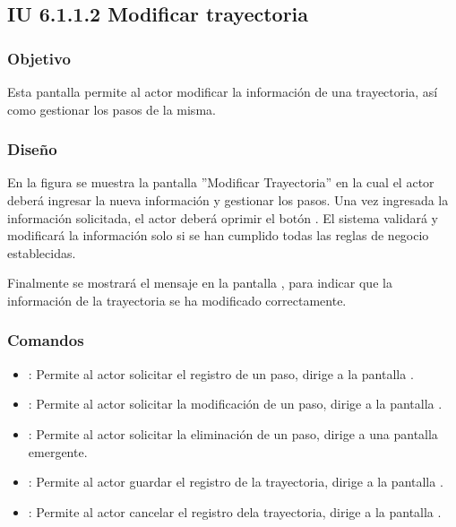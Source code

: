 \subsection{IU 6.1.1.2 Modificar trayectoria}

\subsubsection{Objetivo}
	Esta pantalla permite al actor modificar la información de una trayectoria, así como gestionar los pasos de la misma.
\subsubsection{Diseño}
	En la figura  se muestra la pantalla ''Modificar Trayectoria'' en la cual el actor deberá ingresar la nueva información y gestionar los pasos.
	Una vez ingresada la información solicitada, el actor deberá oprimir el botón  . El sistema validará y modificará la información solo si se han cumplido todas las reglas de negocio establecidas.
	
	Finalmente se mostrará el mensaje  en la pantalla , para indicar que la información de la trayectoria se ha modificado correctamente.

\subsubsection{Comandos}
\begin{itemize}
	\item {}: Permite al actor solicitar el registro de un paso, dirige a la pantalla .
	\item \editar [Modificar]: Permite al actor solicitar la modificación de un paso, dirige a la pantalla .
	\item \eliminar [Eliminar]: Permite al actor solicitar la eliminación de un paso, dirige a una pantalla emergente.
	\item {}: Permite al actor guardar el registro de la trayectoria, dirige a la pantalla .
	\item {}: Permite al actor cancelar el registro dela trayectoria, dirige a la pantalla .
\end{itemize}

